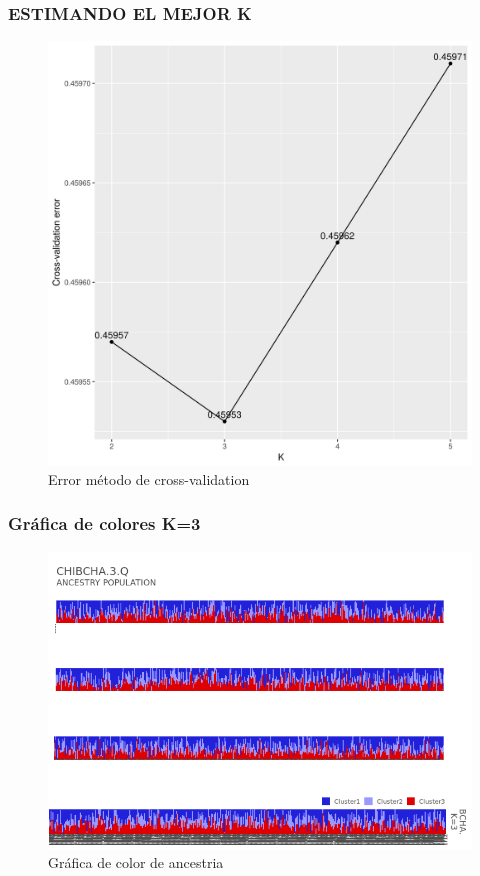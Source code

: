 \documentclass[serif,9pt]{beamer}
\theoremstyle{definition}
\theoremstyle{remark}
\begin{document}
\begin{frame}\frametitle{ESTIMANDO EL MEJOR K}
    
 
\begin{figure}[H]
  \centering
  \includegraphics[scale=0.4]{K5.png}
  \caption{Error m\'etodo de cross-validation}
  \label{fig:crv}
\end{figure}
\end{frame}




\begin{frame}\frametitle{Gr\'afica de colores K=3}
    
 
\begin{figure}[H]
  \centering
  \includegraphics[scale=0.4]{K3.png}
  \caption{Gr\'afica de color de ancestria}
  \label{fig:crv}
\end{figure}
\end{frame}
\end{document}
